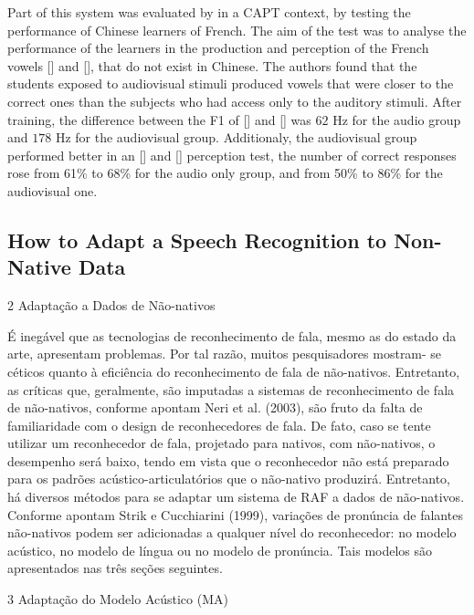 Part of this system was evaluated by \citet{Wang2014} \citep{Wang2014} in a \ac{CAPT} context, by testing the
performance of Chinese learners of French. The aim of the test was to analyse the performance of the learners in the production 
and perception of the French vowels [\textipa{\o}] and [\textipa{\oe}], that do not exist in Chinese. The authors found that the 
students exposed to audiovisual stimuli produced vowels that were closer to the correct ones than the subjects who had access only 
to the auditory stimuli. After training, the difference between the F1 of [\textipa{\o}] and [\textipa{\oe}] was $62$ Hz for the audio
group and $178$ Hz for the audiovisual group. Additionaly, the audiovisual group performed better in 
an [\textipa{\o}] and [\textipa{\oe}] perception test, the number of correct responses rose from 61\% to 68\% for the audio only
group, and from 50\% to 86\% for the audiovisual one.

\subsection{How to Adapt a Speech Recognition to Non-Native Data}

2 Adapta\c{c}\~ao a Dados de N\~ao-nativos

\'E ineg\'avel que as tecnologias de reconhecimento de fala, mesmo as do
estado da arte, apresentam problemas. Por tal raz\~ao, muitos
pesquisadores mostram- se c\'eticos quanto à efici\^encia do reconhecimento
de fala de n\~ao-nativos. Entretanto, as cr\'iticas que, geralmente, s\~ao
imputadas a sistemas de reconhecimento de fala de n\~ao-nativos, conforme
apontam Neri et al. (2003), s\~ao fruto da falta de familiaridade com o
design de reconhecedores de fala. De fato, caso se tente utilizar um
reconhecedor de fala, projetado para nativos, com n\~ao-nativos, o
desempenho ser\'a baixo, tendo em vista que o reconhecedor n\~ao est\'a
preparado para os padr\~oes ac\'ustico-articulat\'orios que o n\~ao-nativo
produzir\'a. Entretanto, h\'a diversos m\'etodos para se adaptar um sistema de
RAF a dados de n\~ao-nativos. Conforme apontam Strik e Cucchiarini (1999),
varia\c{c}\~oes de pron\'uncia de falantes n\~ao-nativos podem ser adicionadas a
qualquer n\'ivel do reconhecedor: no modelo ac\'ustico, no modelo de l\'ingua
ou no modelo de pron\'uncia. Tais modelos s\~ao apresentados nas tr\^es se\c{c}\~oes
seguintes.

3 Adapta\c{c}\~ao do Modelo Ac\'ustico (MA)

